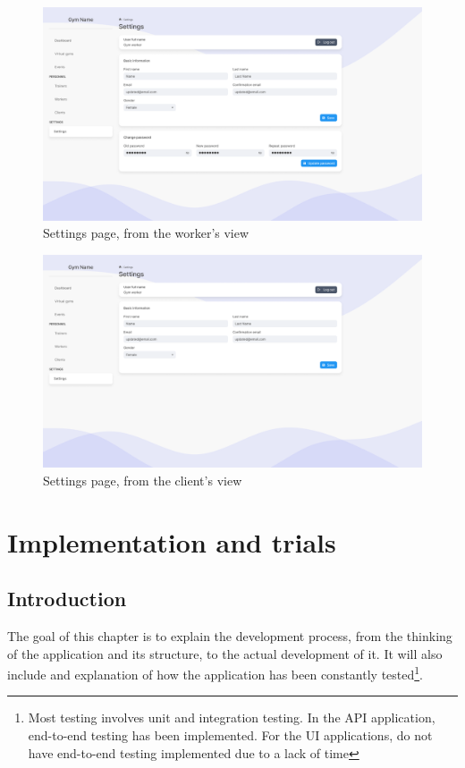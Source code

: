 \documentclass[a4paper, 12pt, oneside]{book}
\begin{document}
\begin{figure}[H]
	\centering
	\includegraphics[width=\textwidth]{assets/ui/Worker.png}
	\caption{Settings page, from the worker's view}
\end{figure}
\begin{figure}[H]
	\centering
	\includegraphics[width=\textwidth]{assets/ui/Client.png}
	\caption{Settings page, from the client's view}
\end{figure}
\chapter{Implementation and trials}
\section{Introduction}
The goal of this chapter is to explain the development process, from the thinking of the application and its structure, to the actual development of it. It will also include and explanation of how the application has been constantly tested\footnote{Most testing involves unit and integration testing. In the API application, end-to-end testing has been implemented. For the UI applications, do not have end-to-end testing implemented due to a lack of time}.
\end{document}
